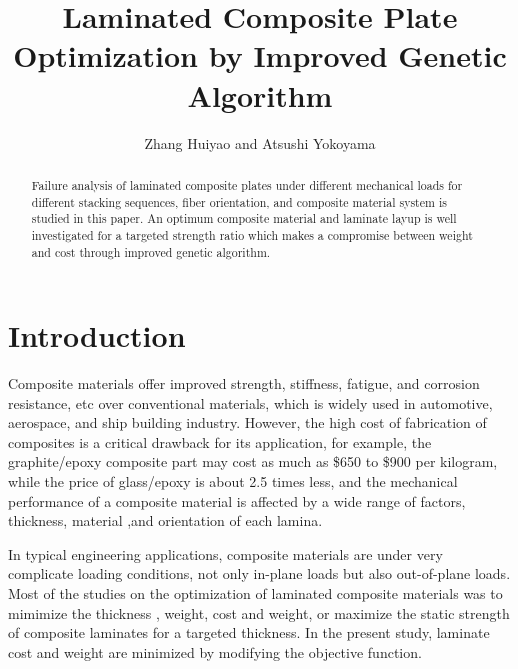 \documentclass[Afour,sageh,times]{sagej}
\begin{document}

\title{Laminated Composite Plate Optimization by Improved Genetic Algorithm}

\author{Zhang Huiyao and
	Atsushi Yokoyama 
}




\begin{abstract}
Failure analysis of laminated composite plates under different mechanical loads for different
stacking sequences, fiber orientation, and composite material system is studied in this paper.
An optimum composite material and laminate layup is well investigated for a targeted strength ratio which
makes a compromise between weight and cost through improved genetic algorithm.
\end{abstract}


\maketitle

\section{Introduction}

Composite materials offer improved strength, stiffness, fatigue, and corrosion
resistance, etc over conventional materials, which is widely used in
automotive, aerospace, and ship building industry.  However, the high cost of
fabrication of composites is a critical drawback for its application, for
example, the graphite/epoxy composite part may cost as much as \$650 to \$900
per kilogram, while the price of glass/epoxy is about 2.5 times less, and  the
mechanical performance of a composite material is affected by a wide range of factors,
thickness, material ,and orientation of each lamina.


In typical engineering applications, composite materials are under very
complicate loading conditions, not only in-plane loads but also out-of-plane
loads. Most of the studies on the optimization of laminated composite materials
was to mimimize the thickness \cite{abu1998optimum,walker2003technique},
weight\cite{fang1993design,deka2005multiobjective,park2008improved}, cost and
weight\cite{deka2005multiobjective,omkar2008artificial}, or maximize the static
strength of composite laminates for a targeted
thickness\cite{walker2003technique,lin2004stacking,kim2007development}. In the
present study, laminate cost and weight are minimized by modifying the objective function.
\end{document}
